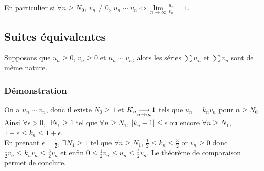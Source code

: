 \documentclass[a4paper,10pt]{book} %
\newcommand{\abs}[1]{\left|#1\right|}
\newcommand{\lime}[4]{#1\underset{\mathclap{#2 \rightarrow #3}}{\longrightarrow} #4}
\begin{document}
En particulier si $\forall n\geq N_0$, $v_n\neq 0$, $u_n\sim v_n \Leftrightarrow \lim\limits_{n\rightarrow \infty}\frac{u_n}{v_n}=1$.\normalsize

\subsection{Suites équivalentes}
Supposons que $u_n\geq 0$, $v_n\geq 0$ et $u_n\sim v_n$, alors les séries $\sum u_n$ et $\sum v_n$ sont de même nature.

\subsubsection{Démonstration}
On a $u_n\sim v_n$, donc il existe $N_0\geq 1$ et $\lime{K_n}{n}{\infty}{1}$ tels que $u_n=k_nv_n$ pour $n\geq N_0$.\\
Ainsi $\forall \epsilon>0$, $\exists N_1\geq 1$ tel que $\forall n\geq N_1$, $\abs{k_n-1}\leq \epsilon$ ou encore $\forall n\geq N_1$, $1-\epsilon\leq k_n\leq 1+\epsilon$.\\

En prenant $\epsilon=\frac{1}{2}$, $\exists N_1\geq 1$ tel que $\forall n\geq N_1$, $\frac{1}{2}\leq k_n\leq \frac{3}{2}$ or $v_n\geq 0$ donc\\$\frac{1}{2}v_n\leq k_nv_n\leq \frac{3}{2}v_n$ et enfin $0\leq \frac{1}{2}v_n\leq u_n\leq \frac{3}{2}v_n$. Le théorème de comparaison permet de conclure.
\end{document}

